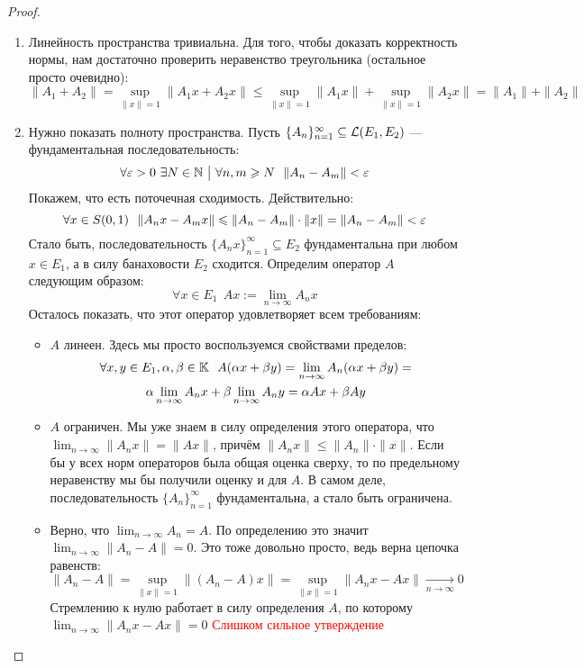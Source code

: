 \begin{proof}~
	\begin{enumerate}
		\item Линейность пространства тривиальна. Для того, чтобы доказать корректность нормы, нам достаточно проверить неравенство треугольника (остальное просто очевидно):
		\[
			\|A_1 + A_2\| = \sup_{\|x\| = 1} \|A_1x + A_2x\| \le \sup_{\|x\| = 1} \|A_1x\| + \sup_{\|x\| = 1} \|A_2x\| = \|A_1\| + \|A_2\|
		\]
		
		\item Нужно показать полноту пространства. Пусть $\{A_n\}_{n = 1}^\infty \subseteq \mathcal{L}(E_1, E_2)$ --- фундаментальная последовательность:
		\[
			\forall \varepsilon > 0\ \exists N \in \mathbb{N} \ \big|\  \forall n, m \geqslant N\ \ \|A_n - A_m\| < \varepsilon
		\]
		Покажем, что есть поточечная сходимость. Действительно:
		\[
			\forall x \in S(0, 1)\ \ \|A_nx - A_mx\| \leqslant \|A_n - A_m\| \cdot \|x\| = \|A_n - A_m\| < \varepsilon
		\]
		Стало быть, последовательность $\{A_nx\}_{n = 1}^\infty \subseteq E_2$ фундаментальна при любом $x \in E_1$, а в силу банаховости $E_2$ сходится. Определим оператор $A$ следующим образом:
		\[
			\forall x \in E_1\ \ Ax := \lim_{n \to \infty} A_nx
		\]
		Осталось показать, что этот оператор удовлетворяет всем требованиям:
		\begin{itemize}
			\item $A$ линеен. Здесь мы просто воспользуемся свойствами пределов:
			\begin{multline*}
				\forall x, y \in E_1, \alpha, \beta \in \mathbb{K}\ \ A(\alpha x + \beta y) = \lim_{n \to \infty} A_n(\alpha x + \beta y) =
				\\
				\alpha \lim_{n \to \infty} A_nx + \beta \lim_{n \to \infty} A_ny = \alpha Ax + \beta Ay
			\end{multline*}
			
			\item $A$ ограничен. Мы уже знаем в силу определения этого оператора, что $\lim_{n \to \infty} \|A_nx\| = \|Ax\|$, причём $\|A_nx\| \le \|A_n\| \cdot \|x\|$. Если бы у всех норм операторов была общая оценка сверху, то по предельному неравенству мы бы получили оценку и для $A$. В самом деле, последовательность $\{A_n\}_{n = 1}^\infty$ фундаментальна, а стало быть ограничена.
			
			\item Верно, что $\lim_{n \to \infty} A_n = A$. По определению это значит $\lim_{n \to \infty} \|A_n - A\| = 0$. Это тоже довольно просто, ведь верна цепочка равенств:
			\[
				\|A_n - A\| = \sup_{\|x\| = 1} \|(A_n - A)x\| = \sup_{\|x\| = 1} \|A_nx - Ax\| \xrightarrow[n \to \infty]{} 0
			\]
			Стремлению к нулю работает в силу определения $A$, по которому $\lim_{n \to \infty} \|A_nx - Ax\| = 0$ \textcolor{red}{Слишком сильное утверждение}
		\end{itemize}
	\end{enumerate}
\end{proof}

